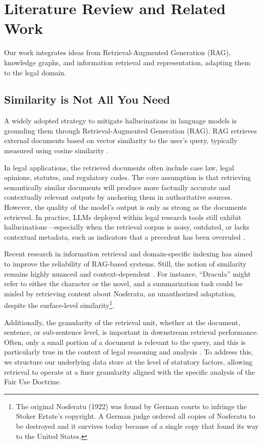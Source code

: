 \section{Literature Review and Related Work}
Our work integrates ideas from Retrieval-Augmented Generation (RAG), knowledge graphs, and information retrieval and representation, adapting them to the legal domain.

\subsection{Similarity is Not All You Need}
A widely adopted strategy to mitigate hallucinations in language models is grounding them through Retrieval-Augmented Generation (RAG). RAG retrieves external documents based on vector similarity to the user’s query, typically measured using cosine similarity \cite{09_OriginalRAGPaper}.

In legal applications, the retrieved documents often include case law, legal opinions, statutes, and regulatory codes. The core assumption is that retrieving semantically similar documents will produce more factually accurate and contextually relevant outputs by anchoring them in authoritative sources. However, the quality of the model’s output is only as strong as the documents retrieved. In practice, LLMs deployed within legal research tools still exhibit hallucinations—especially when the retrieval corpus is noisy, outdated, or lacks contextual metadata, such as indicators that a precedent has been overruled \cite{04_LegalHallucination}.

Recent research in information retrieval and domain-specific indexing has aimed to improve the reliability of RAG-based systems. Still, the notion of similarity remains highly nuanced and context-dependent \cite{03b_SemanticRepresentationContextual}. For instance, “Dracula” might refer to either the character or the novel, and a summarization task could be misled by retrieving content about Nosferatu, an unauthorized adaptation, despite the surface-level similarity\footnote{The original Nosferatu (1922) was found by German courts to infringe the Stoker Estate’s copyright. A German judge ordered all copies of Nosferatu to be destroyed and it survives today because of a single copy that found its way to the United States.}.

Additionally, the granularity of the retrieval unit, whether at the document, sentence, or sub-sentence level, is important in downstream retrieval performance. Often, only a small portion of a document is relevant to the query, and this is particularly true in the context of legal reasoning and analysis \cite{02_DenseRetrieval, 32_LegalCitationNetwork}. To address this, we structure our underlying data store at the level of statutory factors, allowing retrieval to operate at a finer granularity aligned with the specific analysis of the Fair Use Doctrine.

